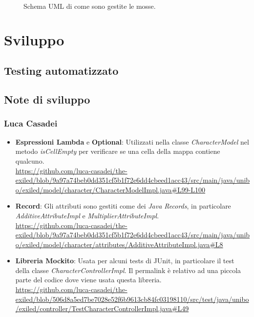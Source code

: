 \documentclass[a4paper,12pt]{report}
\begin{document}
\begin{figure}[H]
	\centering
	
	\caption{Schema UML di come sono gestite le mosse.}
	\label{fig:Schema UML di come sono gestite le mosse.}
\end{figure}


\chapter{Sviluppo}

\section{Testing automatizzato}
\section{Note di sviluppo}

\subsection{Luca Casadei}
\begin{itemize}
	\item \textbf{Espressioni Lambda} e \textbf{Optional}: Utilizzati nella classe \textit{CharacterModel} nel metodo \textit{isCellEmpty} per verificare se una cella della mappa contiene qualcuno.\\
	\url{https://github.com/luca-casadei/the-exiled/blob/9a97a74beb0dd351cf5b1f72e6dd4cbeed1acc43/src/main/java/unibo/exiled/model/character/CharacterModelImpl.java#L99-L100}
	\item \textbf{Record}: Gli attributi sono gestiti come dei \textit{Java Records}, in particolare \textit{AdditiveAttributeImpl} e \textit{MultiplierAttributeImpl}.\\
	\url{https://github.com/luca-casadei/the-exiled/blob/9a97a74beb0dd351cf5b1f72e6dd4cbeed1acc43/src/main/java/unibo/exiled/model/character/attributes/AdditiveAttributeImpl.java#L8}
	\item \textbf{Libreria Mockito}: Usata per alcuni tests di JUnit, in particolare il test della classe \textit{CharacterControllerImpl}. Il permalink è relativo ad una piccola parte del codice dove viene usata questa libreria.\\
	\url{https://github.com/luca-casadei/the-exiled/blob/506d8a5ed7be7028e52f6b9613cb84fc03198110/src/test/java/unibo/exiled/controller/TestCharacterControllerImpl.java#L49}
\end{itemize}
\end{document}
